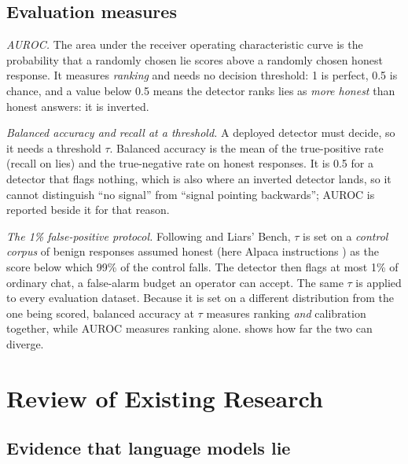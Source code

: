 \subsection{Evaluation measures}
\label{sec:prelim-metrics}

\emph{AUROC.} The area under the receiver operating characteristic curve is the probability that a
randomly chosen lie scores above a randomly chosen honest response. It measures \emph{ranking} and
needs no decision threshold: 1 is perfect, 0.5 is chance, and a value below 0.5 means the detector
ranks lies as \emph{more honest} than honest answers: it is inverted.

\emph{Balanced accuracy and recall at a threshold.} A deployed detector must decide, so it needs a
threshold $\tau$. Balanced accuracy is the mean of the true-positive rate (recall on lies) and the
true-negative rate on honest responses. It is 0.5 for a detector that flags nothing, which is also
where an inverted detector lands, so it cannot distinguish ``no signal'' from ``signal pointing
backwards''; AUROC is reported beside it for that reason.

\emph{The 1\% false-positive protocol.} Following \textcite{goldowskydill2025detecting} and Liars'
Bench, $\tau$ is set on a \emph{control corpus} of benign responses assumed honest (here Alpaca
instructions \cite{taori2023alpaca}) as the score below which 99\% of the control falls. The
detector then flags at most 1\% of ordinary chat, a false-alarm budget an operator can accept. The
same $\tau$ is applied to every evaluation dataset. Because it is set on a different distribution
from the one being scored, balanced accuracy at $\tau$ measures ranking \emph{and} calibration
together, while AUROC measures ranking alone.  shows how far the two can diverge.

\section{Review of Existing Research}
\label{sec:review}

\subsection{Evidence that language models lie}
\label{sec:review-evidence}

